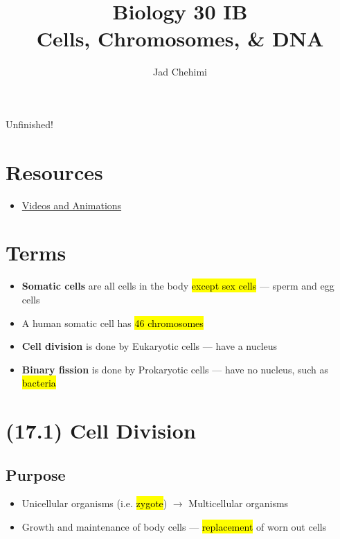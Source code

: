 \documentclass[a4paper,12pt]{article}
\title{Biology 30 IB \\ Cells, Chromosomes, \& DNA}
\author{Jad Chehimi}
\begin{document}
\maketitle

\begin{center}
\Huge
Unfinished!
\normalsize
\end{center}

\section{Resources}
\begin{itemize}
    \item{\href{https://docs.google.com/document/d/1-Agcr85pflQCNP3PUO7vbdybJLy7BT0y3zjFPgRvhuI}{Videos and Animations}}
\end{itemize}

\tableofcontents

\pagebreak

\section{Terms}
\begin{itemize}
    \item{\textbf{Somatic cells} are all cells in the body \hl{except sex cells} --- sperm and egg cells}
    \item{A human somatic cell has \hl{46 chromosomes}}
    \item{\textbf{Cell division} is done by Eukaryotic cells --- have a nucleus}
    \item{\textbf{Binary fission} is done by Prokaryotic cells --- have no nucleus, such as \hl{bacteria}}
\end{itemize}

\section{(17.1) Cell Division}
\subsection{Purpose}
\begin{itemize}
    \item{Unicellular organisms (i.e. \hl{zygote}) $\longrightarrow$ Multicellular organisms}
    \item{Growth and maintenance of body cells --- \hl{replacement} of worn out cells}
\end{itemize}
\end{document}
